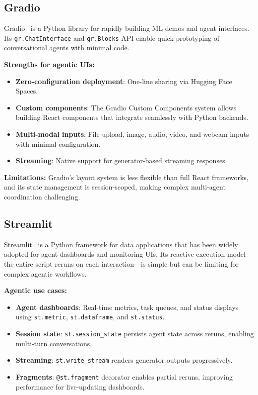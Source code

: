 \subsection{Gradio}
\label{gradio}

Gradio~\cite{abid2019gradio} is a Python library for rapidly building ML demos and agent interfaces. Its \texttt{gr.ChatInterface} and \texttt{gr.Blocks} API enable quick prototyping of conversational agents with minimal code.

\textbf{Strengths for agentic UIs:}

\begin{itemize}
  \item \textbf{Zero-configuration deployment}: One-line sharing via Hugging Face Spaces.
  \item \textbf{Custom components}: The Gradio Custom Components system allows building React components that integrate seamlessly with Python backends.
  \item \textbf{Multi-modal inputs}: File upload, image, audio, video, and webcam inputs with minimal configuration.
  \item \textbf{Streaming}: Native support for generator-based streaming responses.
\end{itemize}

\textbf{Limitations:} Gradio’s layout system is less flexible than full React frameworks, and its state management is session-scoped, making complex multi-agent coordination challenging.

\subsection{Streamlit}
\label{streamlit}

Streamlit~\cite{streamlit2024} is a Python framework for data applications that has been widely adopted for agent dashboards and monitoring UIs. Its reactive execution model---the entire script reruns on each interaction---is simple but can be limiting for complex agentic workflows.

\textbf{Agentic use cases:}

\begin{itemize}
  \item \textbf{Agent dashboards}: Real-time metrics, task queues, and status displays using \texttt{st.metric}, \texttt{st.dataframe}, and \texttt{st.status}.
  \item \textbf{Session state}: \texttt{st.session\_state} persists agent state across reruns, enabling multi-turn conversations.
  \item \textbf{Streaming}: \texttt{st.write\_stream} renders generator outputs progressively.
  \item \textbf{Fragments}: \texttt{@st.fragment} decorator enables partial reruns, improving performance for live-updating dashboards.
\end{itemize}


